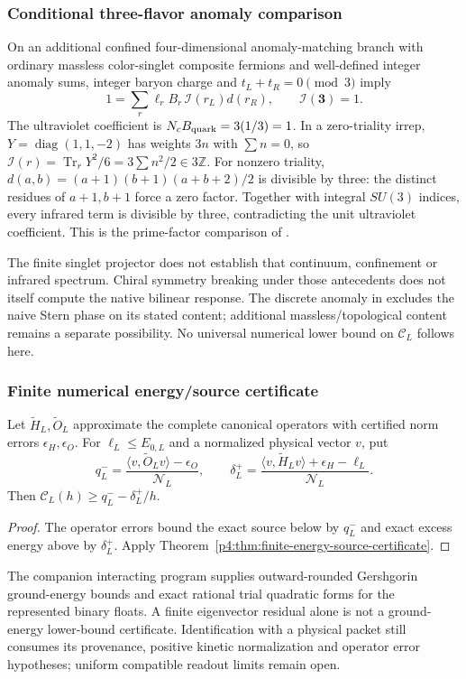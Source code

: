 \documentclass[12pt,a4paper]{article}
\begin{document}
\subsubsection{Conditional three-flavor anomaly comparison}
\label{p10:app:conditional-chiral-anomaly}
On an additional confined four-dimensional anomaly-matching branch
with ordinary massless color-singlet composite fermions and well-defined
integer anomaly sums, integer baryon charge and
$t_L+t_R=0\pmod3$ imply
\[
 1=\sum_r\ell_rB_r\,\mathcal I(r_L)d(r_R),\qquad
 \mathcal I(\mathbf3)=1.
\]
The ultraviolet coefficient is $N_cB_{\rm quark}=3(1/3)=1$.
In a zero-triality irrep, $Y=\operatorname{diag}(1,1,-2)$ has
weights $3n$ with $\sum n=0$, so
$\mathcal I(r)=\operatorname{Tr}_rY^2/6
 =3\sum n^2/2\in3\mathbb Z$.
For nonzero triality,
$d(a,b)=(a+1)(b+1)(a+b+2)/2$ is divisible by three:
the distinct residues of $a+1,b+1$ force a zero factor.
Together with integral $SU(3)$ indices, every infrared term is divisible
by three, contradicting the unit ultraviolet coefficient.
This is the prime-factor comparison of
\cite{CiambrielloEtAl2024ChiralStrategy}.

The finite singlet projector does not establish that continuum,
confinement or infrared spectrum. Chiral symmetry breaking under those
antecedents does not itself compute the native bilinear response.
The discrete anomaly in \cite{Tanizaki2018AnomalyConstraint}
excludes the naive Stern phase on its stated content; additional
massless/topological content remains a separate possibility.
No universal numerical lower bound on $\mathcal C_L$ follows here.


\subsubsection{Finite numerical energy/source certificate}
\label{p10:app:numerical-chiral-certificate}
\begin{proposition}
\label{p10:prop:numerical-chiral-certificate}
Let $\widetilde H_L,\widetilde O_L$ approximate the complete canonical
operators with certified norm errors $\epsilon_H,\epsilon_O$.
For $\ell_L\le E_{0,L}$ and a normalized physical vector $v$, put
\[
 q_L^-=\frac{\langle v,\widetilde O_Lv\rangle-\epsilon_O}{\mathcal N_L},
 \qquad
 \delta_L^+=
 \frac{\langle v,\widetilde H_Lv\rangle+\epsilon_H-\ell_L}{\mathcal N_L}.
\]
Then $\mathcal C_L(h)\ge q_L^- -\delta_L^+/h$.
\end{proposition}
\begin{proof}
The operator errors bound the exact source below by $q_L^-$
and exact excess energy above by $\delta_L^+$. Apply
Theorem~\ref{p4:thm:finite-energy-source-certificate}.
\end{proof}
The companion interacting program supplies outward-rounded Gershgorin
ground-energy bounds and exact rational trial quadratic forms for the
represented binary floats. A finite eigenvector residual alone is not
a ground-energy lower-bound certificate. Identification with a physical
packet still consumes its provenance, positive kinetic normalization and
operator error hypotheses; uniform compatible readout limits remain open.
\end{document}
